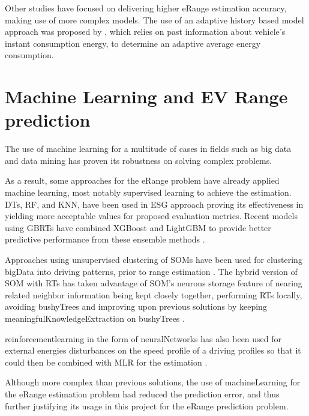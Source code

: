 Other studies have focused on delivering 
higher \gls{eRange} estimation accuracy,
making use of more complex models. 
The use of an adaptive history based model 
approach was proposed by \citep{classicEVX},
which relies on past information about
vehicle's instant consumption energy, to determine an
adaptive average energy consumption.

\section{Machine Learning and EV Range prediction}
\label{sec:stateOfArtML}

The use of machine learning for a multitude
of cases \citep{machineLearningCaseStudy} in fields such as 
big data \citep{machineLearningBigData, machineLearningBigData2}
and data mining \citep{businessDataMining} has 
proven its robustness on solving complex problems.


As a result, some approaches for the \gls{eRange}
problem have already applied machine learning,
most notably supervised learning to achieve the estimation.
\Glspl{DT}, \gls{RF}, and \gls{KNN}, have been 
used in \gls{ESG} approach 
\citep{eRangeMachineLearningEnsemble} proving its 
effectiveness in yielding more acceptable values
for proposed evaluation metrics.
Recent models using \glspl{GBRT} have
combined \gls{XGBoost} and \gls{LightGBM} 
to provide better predictive performance
from these \gls{ensemble} methods 
\citep{machineLearningERangeGradientBoostRts}.

Approaches using unsupervised clustering 
of \glspl{SOM} have been used for clustering \gls{bigData} 
into driving patterns, prior to range estimation 
\citep{eRangeMachineLearningGHSOM}.
The hybrid version of \gls{SOM} with \glspl{RT} 
has taken advantage of \gls{SOM}'s neurons storage 
feature of nearing related neighbor information
being kept closely together, performing \glspl{RT}
locally, avoiding \glspl{bushyTree} and improving
upon previous solutions by keeping 
\gls{meaningfulKnowledgeExtraction} on \glspl{bushyTree}
\citep{machineLearningERangeSOMandRts}.

\Gls{reinforcementlearning} in the form of \glspl{neuralNetwork}
has also been used for external energies 
disturbances on the speed profile of a driving profiles 
so that it could then be combined with \gls{MLR} 
for the estimation \citep{eRangeMachineLearningNeuralnetworkMLR}.

Although more complex than previous solutions, 
the use of \gls{machineLearning} for the 
\gls{eRange} estimation problem had reduced 
the prediction error, and thus further justifying
its usage in this project for the \gls{eRange}
prediction problem.